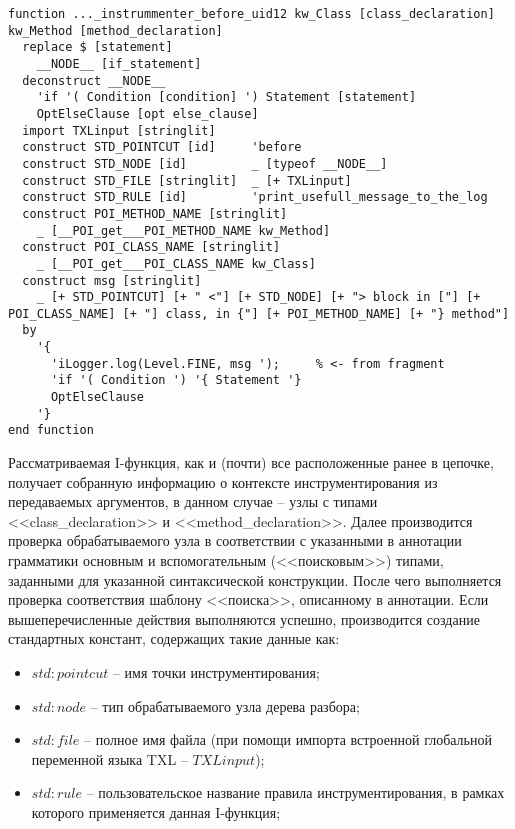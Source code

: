 \begin{lstlisting}[frame=single, language=TXL, label={ifunc-example}, caption={Пример синтезированной I-функции.}]
function ..._instrummenter_before_uid12 kw_Class [class_declaration] kw_Method [method_declaration]
  replace $ [statement]
    __NODE__ [if_statement]
  deconstruct __NODE__
    'if '( Condition [condition] ') Statement [statement]
    OptElseClause [opt else_clause]
  import TXLinput [stringlit]
  construct STD_POINTCUT [id]     'before
  construct STD_NODE [id]         _ [typeof __NODE__]
  construct STD_FILE [stringlit]  _ [+ TXLinput]
  construct STD_RULE [id]         'print_usefull_message_to_the_log
  construct POI_METHOD_NAME [stringlit]
    _ [__POI_get___POI_METHOD_NAME kw_Method]
  construct POI_CLASS_NAME [stringlit]
    _ [__POI_get___POI_CLASS_NAME kw_Class]
  construct msg [stringlit]
    _ [+ STD_POINTCUT] [+ " <"] [+ STD_NODE] [+ "> block in ["] [+ POI_CLASS_NAME] [+ "] class, in {"] [+ POI_METHOD_NAME] [+ "} method"]
  by
    '{
      'iLogger.log(Level.FINE, msg ');     % <- from fragment
      'if '( Condition ') '{ Statement '}
      OptElseClause
    '}
end function
\end{lstlisting}

Рассматриваемая I-функция, как и (почти) все расположенные ранее в цепочке, получает собранную информацию о контексте инструментирования из передаваемых аргументов, в данном случае -- узлы с типами <<class\_declaration>> и <<method\_declaration>>.
Далее производится проверка обрабатываемого узла в соответствии с указанными в аннотации грамматики основным и вспомогательным (<<поисковым>>) типами, заданными для указанной синтаксической конструкции.
После чего выполняется проверка соответствия шаблону <<поиска>>, описанному в аннотации.
Если вышеперечисленные действия выполняются успешно, производится создание стандартных констант, содержащих такие данные как:

\begin{itemize}[noitemsep]
  \item $std:pointcut$  -- имя точки инструментирования;
  \item $std:node$      -- тип обрабатываемого узла дерева разбора;
  \item $std:file$      -- полное имя файла (при помощи импорта встроенной глобальной переменной языка TXL -- $TXLinput$);
  \item $std:rule$      -- пользовательское название правила инструментирования, в рамках которого применяется данная I-функция;
\end{itemize}


